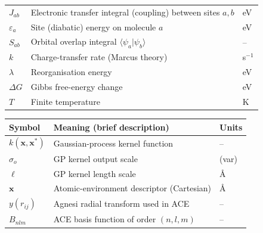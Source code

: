 \begin{center}
\begin{tabular}{p{2.2cm} p{8.5cm} p{}}
$J_{ab}$              & Electronic transfer integral (coupling) between sites $a,b$ & eV \\
$\varepsilon_{a}$     & Site (diabatic) energy on molecule $a$     & eV \\
$S_{ab}$              & Orbital overlap integral $\langle\psi_a|\psi_b\rangle$ & -- \\
$k$                   & Charge-transfer rate (Marcus theory)       & s$^{-1}$ \\
$\lambda$             & Reorganisation energy                     & eV \\
$\Delta G$            & Gibbs free-energy change                  & eV \\
$T$                   & Finite temperature                      & K \\
\bottomrule
\end{tabular}
\end{center}
\newpage
\begin{center}
\begin{tabular}{p{2.2cm} p{8.5cm} p{}}
Symbol & Meaning (brief description) & Units \\
\midrule\midrule
$k(\mathbf{x},\mathbf{x}^\ast)$ & Gaussian-process kernel function  & -- \\
$\sigma_{o}$          & GP kernel output scale                    & (var) \\
$\ell$                & GP kernel length scale                    & Å \\
$\mathbf{x}$          & Atomic-environment descriptor (Cartesian) & Å \\
$y(r_{ij})$           & Agnesi radial transform used in ACE        & -- \\
$B_{nlm}$             & ACE basis function of order $(n,l,m)$      & -- \\
\bottomrule
\end{tabular}
\end{center}
\newpage
